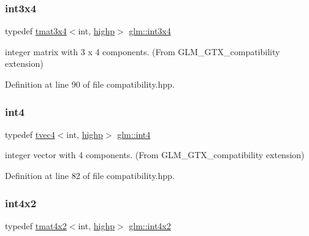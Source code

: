 \subsubsection{\texorpdfstring{int3x4}{int3x4}}
{\footnotesize\ttfamily typedef \mbox{\hyperlink{structglm_1_1tmat3x4}{tmat3x4}}$<$int, \mbox{\hyperlink{namespaceglm_a0f04f086094c747d227af4425893f545ac6f7eab42eacbb10d59a58e95e362074}{highp}}$>$ \mbox{\hyperlink{group__gtx__compatibility_ga7500192cce87fb3a48f7119d6646af5a}{glm\+::int3x4}}}



integer matrix with 3 x 4 components. (From G\+L\+M\+\_\+\+G\+T\+X\+\_\+compatibility extension) 



Definition at line 90 of file compatibility.\+hpp.

\mbox{\label{group__gtx__compatibility_gab93125af983ab22b9647b64770b26aa1}} 
\subsubsection{\texorpdfstring{int4}{int4}}
{\footnotesize\ttfamily typedef \mbox{\hyperlink{structglm_1_1tvec4}{tvec4}}$<$int, \mbox{\hyperlink{namespaceglm_a0f04f086094c747d227af4425893f545ac6f7eab42eacbb10d59a58e95e362074}{highp}}$>$ \mbox{\hyperlink{group__gtx__compatibility_gab93125af983ab22b9647b64770b26aa1}{glm\+::int4}}}



integer vector with 4 components. (From G\+L\+M\+\_\+\+G\+T\+X\+\_\+compatibility extension) 



Definition at line 82 of file compatibility.\+hpp.

\mbox{\label{group__gtx__compatibility_ga91c24f1a2df5d20ea98f97ec243782c3}} 
\subsubsection{\texorpdfstring{int4x2}{int4x2}}
{\footnotesize\ttfamily typedef \mbox{\hyperlink{structglm_1_1tmat4x2}{tmat4x2}}$<$int, \mbox{\hyperlink{namespaceglm_a0f04f086094c747d227af4425893f545ac6f7eab42eacbb10d59a58e95e362074}{highp}}$>$ \mbox{\hyperlink{group__gtx__compatibility_ga91c24f1a2df5d20ea98f97ec243782c3}{glm\+::int4x2}}}



